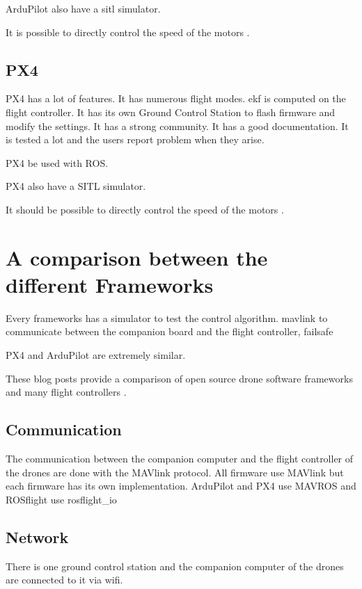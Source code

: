 ArduPilot also have a \gls{sitl} simulator.

It is possible to directly control the speed of the motors \cite{github_ardupilot_11859}.

\subsection{PX4}
PX4 has a lot of features.
It has numerous flight modes.
\Gls{ekf} is computed on the flight controller.
It has its own Ground Control Station to flash firmware and modify the settings.
It has a strong community.
It has a good documentation.
It is tested a lot and the users report problem when they arise.

PX4 be used  with ROS.

PX4 also have a SITL simulator.

It should be possible to directly control the speed of the motors \cite{px4_low_level_control}.

\section{A comparison between the different Frameworks}
Every frameworks has a simulator to test the control algorithm.
mavlink to communicate between the companion board and the flight controller, failsafe

PX4 and ArduPilot are extremely similar.

These blog posts provide a comparison of open source drone software frameworks \cite{drone_software_projects} and many flight controllers \cite{drone_flight_controllers}.

\subsection{Communication}
The communication between the companion computer and the flight controller of the drones are done with the MAVlink protocol. All firmware use MAVlink but each firmware has its own implementation. ArduPilot and PX4 use MAVROS and ROSflight use rosflight\_io

\subsection{Network}
There is one ground control station and the companion computer of the drones are connected to it via wifi.

